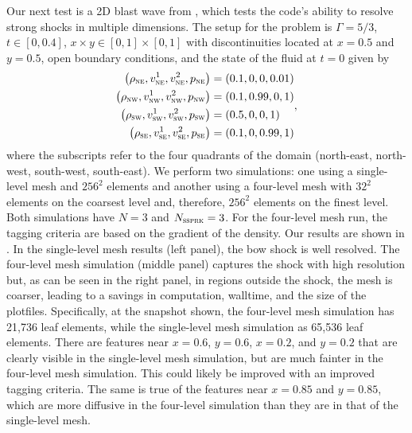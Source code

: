 Our next test is a 2D blast wave from \citet{db2002},
which tests the code's
ability to resolve strong shocks in multiple dimensions.
The setup for the problem is
$\Gamma=5/3$,
$t\in\left[0,0.4\right]$,
$x\times y\in\left[0,1\right]\times\left[0,1\right]$
with discontinuities located at $x=0.5$ and $y=0.5$,
open boundary conditions,
and the state of the fluid at $t=0$ given by
\begin{align}
\begin{split}
  \left(\rho_{\textsc{ne}},v^{1}_{\textsc{ne}},
  v^{2}_{\textsc{ne}},p_{\textsc{ne}}\right)
  &=\left(0.1,0,0,0.01\right) \\
  \left(\rho_{\textsc{nw}},v^{1}_{\textsc{nw}},
  v^{2}_{\textsc{nw}},p_{\textsc{nw}}\right)
  &=\left(0.1,0.99,0,1\right) \\
  \left(\rho_{\textsc{sw}},v^{1}_{\textsc{sw}},
  v^{2}_{\textsc{sw}},p_{\textsc{sw}}\right)
  &=\left(0.5,0,0,1\right) \\
  \left(\rho_{\textsc{se}},v^{1}_{\textsc{se}},
  v^{2}_{\textsc{se}},p_{\textsc{se}}\right)
  &=\left(0.1,0,0.99,1\right)
\end{split},
\end{align}
where the subscripts refer to the four quadrants of the domain
(north-east, north-west, south-west, south-east).
We perform two simulations: one using a single-level mesh and $256^{2}$
elements and another using a four-level mesh with $32^{2}$
elements on the coarsest level
and, therefore, $256^{2}$ elements on the finest level.
Both simulations have $N=3$ and $N_{\textsc{ssprk}}=3$.
For the four-level mesh run, the tagging criteria are based
on the gradient of the density.
Our results are shown in .
In the single-level mesh results (left panel),
the bow shock is well resolved.
The four-level mesh simulation (middle panel)
captures the shock with high resolution but, as can be seen in the right panel,
in regions outside the shock, the mesh is coarser, leading to a savings in
computation, walltime, and the size of the plotfiles.
Specifically, at the snapshot shown, the four-level mesh simulation has
21,736 leaf elements, while the single-level mesh simulation as 65,536
leaf elements.
There are features near
$x=0.6$, $y=0.6$, $x=0.2$, and $y=0.2$ that are clearly
visible in the single-level
mesh simulation, but are much fainter in the four-level mesh simulation.
This could likely be improved with an improved tagging criteria.
The same is true of the features near $x=0.85$ and $y=0.85$,
which are more diffusive in the four-level simulation
than they are in that of the single-level mesh.
